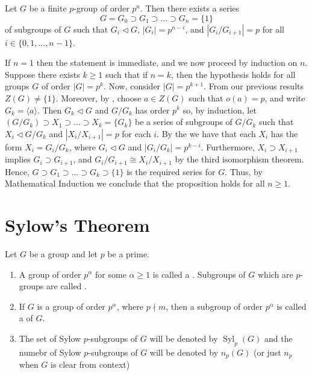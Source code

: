 \documentclass[12pt, a4paper, twoside, openright, titlepage]{book}
\begin{document}
\begin{thm}{}{}
    Let $G$ be a finite $p$-group of order $p^n$. Then there exists a series \begin{equation*}
        G = G_0 \supset G_1\supset ...\supset G_n = \{1\}
    \end{equation*}
    of subgroups of $G$ such that $G_i \vartriangleleft G$, $|G_i| = p^{n-i}$, and $|G_i/G_{i+1}| = p$ for all $i \in \{0,1,...,n-1\}$.
\end{thm}
\begin{proof*}{}{}
    If $n = 1$ then the statement is immediate, and we now proceed by induction on $n$. Suppose there exists $k \geq 1$ such that if $n = k$, then the hypothesis holds for all groups $G$ of order $|G| = p^k$. Now, consider $|G| = p^{k+1}$. From our previous results $Z(G) \neq \{1\}$. Moreover, by , choose $a \in Z(G)$ such that $o(a) = p$, and write $G_k = \langle a \rangle$. Then $G_k\vartriangleleft G$ and $G/G_k$ has order $p^k$ so, by induction, let $(G/G_k)\supset X_1\supset ... \supset X_k = \{G_k\}$ be a series of subgroups of $G/G_k$ such that $X_i \vartriangleleft G/G_k$ and $|X_i/X_{i+1}| = p$ for each $i$. By the  we have that each $X_i$ has the form $X_i = G_i/G_k$, where $G_i \vartriangleleft G$ and $|G_i/G_k| = p^{k-i}$. Furthermore, $X_i \supset X_{i+1}$ implies $G_i \supset G_{i+1}$, and $G_i/G_{i+1} \cong X_i/X_{i+1}$ by the third isomorphism theorem. Hence, $G\supset G_1\supset ... \supset G_k \supset \{1\}$ is the required series for $G$. Thus, by Mathematical Induction we conclude that the proposition holds for all $n \geq 1$.
\end{proof*}


\section{\textsection Sylow's Theorem}

\begin{defn}{}{}
    Let $G$ be a group and let $p$ be a prime.
    \begin{enumerate}
        \item A group of order $p^{\alpha}$ for some $\alpha \geq 1$ is called a . Subgroups of $G$ which are $p$-groups are called .
        \item If $G$ is a group of order $p^{\alpha}$, where $p\nmid m$, then a subgroup of order $p^{\alpha}$ is called a  of $G$.
        \item The set of Sylow $p$-subgroups of $G$ will be denoted by $\operatorname{Syl}_p(G)$ and the numebr of Sylow $p$-subgroups of $G$ will be denoted by $n_p(G)$ (or just $n_p$ when $G$ is clear from context)
    \end{enumerate}
\end{defn}
\end{document}
